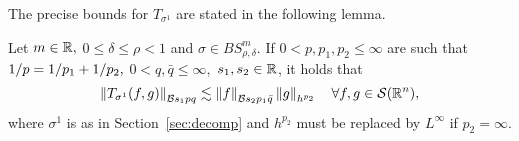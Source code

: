 The precise bounds for $T_{\sigma^1}$ are stated in the following lemma.

\begin{lemma}\label{lem:T1} Let $m \in \mathbb{R},$  $0 \le \delta\le  \rho < 1$ and $\sigma \in BS^m_{\rho, \delta}$. If   $0<p,p_1,p_2\le \infty$ are such that $1/p=1/p_1+1/p_2,$ $0 < q ,\bar{q}\leq \infty,$ $s_1, s_2 \in \mathbb{R}$, it holds that
\begin{equation}\label{eq:estT1}
\left\|T_{\sigma^1}(f,g)\right\|_{\mathcal{B}{s_1}{p}{q}}  \lesssim \left\|f\right\|_{\mathcal{B}{s_2}{p_1}{\bar{q}}} \left\|g\right\|_{h^{p_2}} \quad \forall f, g \in {\mathcal{S}}({{\mathbb R}^n}),
\end{equation}
where $\sigma^1$ is as in Section~\ref{sec:decomp} and $h^{p_2}$ must be replaced by $L^\infty$ if $p_2=\infty.$
\end{lemma}







